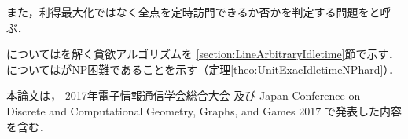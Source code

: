 また，利得最大化ではなく全点を定時訪問できるか否かを判定する問題を{\timeSpecifiedPatProbDecision}と呼ぶ．


{\graphLine}については{\timeSpecifiedPatProbDecision}を解く貪欲アルゴリズムを
\ref{section:LineArbitraryIdletime}節で示す．
{\graphUnit}については{\timeSpecifiedPatProb}がNP困難であることを示す（定理\ref{theo:UnitExacIdletimeNPhard}）．


本論文は，
2017年電子情報通信学会総合大会\cite{ieice}%
及び
Japan Conference on Discrete and Computational Geometry, Graphs, and Games 2017\cite{jcdcggg}%
で発表した内容を含む．

